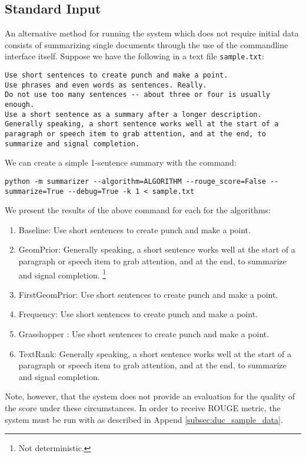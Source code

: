 \documentclass[11pt]{article}
\begin{document}
\subsection{Standard Input}
\label{subsec:standard_input}
An alternative method for running the system which does not require initial data consists of summarizing single documents through the use of the commandline interface itself. Suppose we have the following in a text file \verb|sample.txt|:
\begin{verbatim}
Use short sentences to create punch and make a point.
Use phrases and even words as sentences. Really.
Do not use too many sentences -- about three or four is usually enough.
Use a short sentence as a summary after a longer description.
Generally speaking, a short sentence works well at the start of a paragraph or speech item to grab attention, and at the end, to summarize and signal completion.
\end{verbatim}
We can create a simple 1-sentence summary with the command:
\begin{verbatim}
python -m summarizer --algorithm=ALGORITHM --rouge_score=False --summarize=True --debug=True -k 1 < sample.txt
\end{verbatim}
We present the results of the above command for each for the algorithms:
\begin{enumerate}
\item {\sc Baseline}: Use short sentences to create punch and make a point.
\item {\sc GeomPrior}: Generally speaking, a short sentence works well at the start of a paragraph or speech item to grab attention, and at the end, to summarize and signal completion. \footnote{Not deterministic.}
\item {\sc FirstGeomPrior}: Use short sentences to create punch and make a point.
\item {\sc Frequency}: Use short sentences to create punch and make a point.
\item {\sc Grasshopper }: Use short sentences to create punch and make a point.
\item {\sc TextRank}: Generally speaking, a short sentence works well at the start of a paragraph or speech item to grab attention, and at the end, to summarize and signal completion.
\end{enumerate}
Note, however, that the system does not provide an evaluation for the quality of the score under these circumstances. In order to receive ROUGE metric, the system must be run with as described in Append \ref{subsec:duc_sample_data}.
\end{document}
